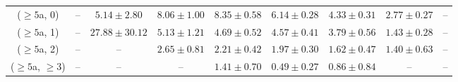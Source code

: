 \begin{table}[h!]
{\begin{tabular}{ccccccccc}
	($\ge5$a, 0) & -- & $5.14\pm 2.80$ & $8.06\pm 1.00$ & $8.35\pm 0.58$ & $6.14\pm 0.28$ & $4.33\pm 0.31$ & $2.77\pm 0.27$ & -- \\[0.5ex] 
	($\ge5$a, 1) & -- & $27.88\pm 30.12$ & $5.13\pm 1.21$ & $4.69\pm 0.52$ & $4.57\pm 0.41$ & $3.79\pm 0.56$ & $1.43\pm 0.28$ & -- \\[0.5ex] 
	($\ge5$a, 2) & -- & -- & $2.65\pm 0.81$ & $2.21\pm 0.42$ & $1.97\pm 0.30$ & $1.62\pm 0.47$ & $1.40\pm 0.63$ & -- \\[0.5ex] 
	($\ge5$a, $\ge3$) & -- & -- & -- & $1.41\pm 0.70$ & $0.49\pm 0.27$ & $0.86\pm 0.84$ & -- & -- \\[0.5ex] 
	\hline
	\hline
\end{tabular}}
\end{table}
